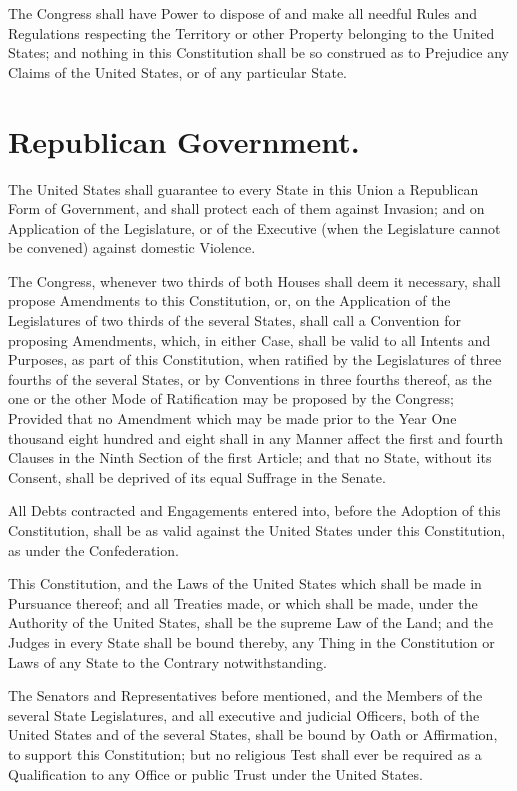 \documentclass[12pt]{constitution}
\begin{document}
The Congress shall have Power to dispose of and make all needful Rules and
Regulations respecting the Territory or other Property belonging to the United
States; and nothing in this Constitution shall be so construed as to Prejudice
any Claims of the United States, or of any particular State.


\section{Republican Government.}
The United States shall guarantee to every State in this Union a Republican
Form of Government, and shall protect each of them against Invasion; and on
Application of the Legislature, or of the Executive (when the Legislature
cannot be convened) against domestic Violence.




The Congress, whenever two thirds of both Houses shall deem it necessary, shall
propose Amendments to this Constitution, or, on the Application of the
Legislatures of two thirds of the several States, shall call a Convention for
proposing Amendments, which, in either Case, shall be valid to all Intents and
Purposes, as part of this Constitution, when ratified by the Legislatures of
three fourths of the several States, or by Conventions in three fourths
thereof, as the one or the other Mode of Ratification may be proposed by the
Congress; Provided that no Amendment which may be made prior to the Year One
thousand eight hundred and eight shall in any Manner affect the first and
fourth Clauses in the Ninth Section of the first Article; and that no State,
without its Consent, shall be deprived of its equal Suffrage in the Senate.



All Debts contracted and Engagements entered into, before the Adoption of this
Constitution, shall be as valid against the United States under this
Constitution, as under the Confederation.

This Constitution, and the Laws of the United States which shall be made in
Pursuance thereof; and all Treaties made, or which shall be made, under the
Authority of the United States, shall be the supreme Law of the Land; and the
Judges in every State shall be bound thereby, any Thing in the Constitution or
Laws of any State to the Contrary notwithstanding.

The Senators and Representatives before mentioned, and the Members of the
several State Legislatures, and all executive and judicial Officers, both of
the United States and of the several States, shall be bound by Oath or
Affirmation, to support this Constitution; but no religious Test shall ever be
required as a Qualification to any Office or public Trust under the United
States.
\end{document}
